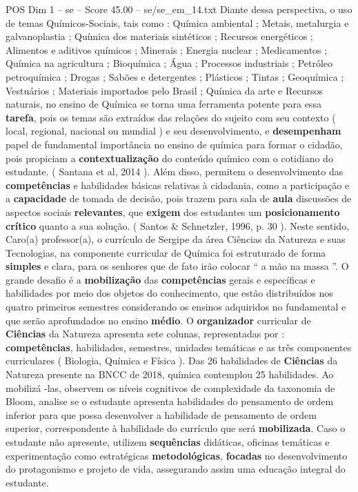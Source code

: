 \begin{textsample}{POS Dim 1 – se – Score 45.00 – se/se\_em\_14.txt}
Diante dessa perspectiva, o uso de temas Químicos-Sociais, tais como : Química ambiental ; Metais, metalurgia e galvanoplastia ; Química dos materiais sintéticos ; Recursos energéticos ; Alimentos e aditivos químicos ; Minerais ; Energia nuclear ; Medicamentos ; Química na agricultura ; Bioquímica ; Água ; Processos industriais ; Petróleo petroquímica ; Drogas ; Sabões e detergentes ; Plásticos ; Tintas ; Geoquímica ; Vestuários ; Materiais importados pelo Brasil ; Química da arte e Recursos naturais, no ensino de Química se torna uma ferramenta potente para essa \textbf{tarefa}, pois os temas são extraídos das relações do sujeito com seu contexto ( local, regional, nacional ou mundial ) e seu desenvolvimento, e \textbf{desempenham} papel de fundamental importância no ensino de química para formar o cidadão, pois propiciam a \textbf{contextualização} do conteúdo químico com o cotidiano do estudante. ( Santana et al, 2014 ).
Além disso, permitem o desenvolvimento das \textbf{competências} e habilidades básicas relativas à cidadania, como a participação e a \textbf{capacidade} de tomada de decisão, pois trazem para sala de \textbf{aula} discussões de aspectos sociais \textbf{relevantes}, que \textbf{exigem} dos estudantes um \textbf{posicionamento} \textbf{crítico} quanto a sua solução. ( Santos \& Schnetzler, 1996, p. 30 ).
Neste sentido, Caro(a) professor(a), o currículo de Sergipe da área Ciências da Natureza e suas Tecnologias, na componente curricular de Química foi estruturado de forma \textbf{simples} e clara, para os senhores que de fato irão colocar “ a mão na massa ”.
O grande desafio é a \textbf{mobilização} das \textbf{competências} gerais e específicas e habilidades por meio dos objetos do conhecimento, que estão distribuídos nos quatro primeiros semestres considerando os ensinos adquiridos no fundamental e que serão aprofundados no ensino \textbf{médio}.
O \textbf{organizador} curricular de \textbf{Ciências} da Natureza apresenta sete colunas, representadas por : \textbf{competências}, habilidades, semestres, unidades temáticas e as três componentes curriculares ( Biologia, Química e Física ).
Das 26 habilidades de \textbf{Ciências} da Natureza presente na BNCC de 2018, química contemplou 25 habilidades.
Ao mobilizá -las, observem os níveis cognitivos de complexidade da taxonomia de Bloom, analise se o estudante apresenta habilidades do pensamento de ordem inferior para que possa desenvolver a habilidade de pensamento de ordem superior, correspondente à habilidade do currículo que será \textbf{mobilizada}.
Caso o estudante não apresente, utilizem \textbf{sequências} didáticas, oficinas temáticas e experimentação como estratégicas \textbf{metodológicas}, \textbf{focadas} no desenvolvimento do protagonismo e projeto de vida, assegurando assim uma educação integral do estudante.

\end{textsample}
